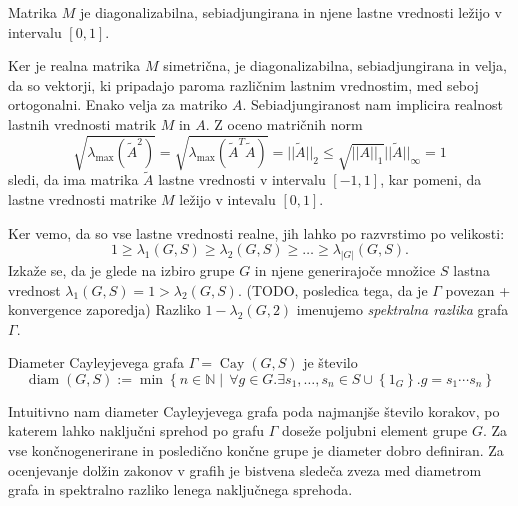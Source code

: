 \documentclass[mat1, tisk]{fmfdelo}
\numberwithin{equation}{section}  %
\begin{document}
\begin{lema}
\label{lem_M_je_sebiadjungirana}
Matrika $M$ je diagonalizabilna, sebiadjungirana in njene lastne vrednosti ležijo v intervalu $[0, 1]$.
\end{lema}
\begin{dokaz}
Ker je realna matrika $M$ simetrična, je diagonalizabilna, sebiadjungirana in velja, da so vektorji, ki pripadajo paroma različnim lastnim vrednostim, med seboj ortogonalni. Enako velja za matriko $A$. Sebiadjungiranost nam implicira realnost lastnih vrednosti matrik $M$ in $A$.
Z oceno matričnih norm \begin{equation*}
    \sqrt{ \lambda_{\max} (\tilde{A}^2)} = \sqrt{\lambda_{\max} (\tilde{A}^{T} \tilde{A} )}  = \lvert\lvert \tilde{A} \rvert\rvert_2 \le \sqrt{\lvert\lvert A \rvert\rvert_1}  \lvert\lvert \tilde{A} \rvert\rvert_{\infty} = 1 
\end{equation*}  
sledi, da ima matrika $\tilde{A}$ lastne vrednosti v intervalu $[-1 ,1]$, kar pomeni, da lastne vrednosti matrike $M$ ležijo v intevalu $[0, 1]$. 
\end{dokaz}

Ker vemo, da so vse lastne vrednosti realne, jih lahko po razvrstimo po velikosti: 
\begin{equation*}
1 \ge \lambda_1(G, S) \ge \lambda_2(G, S) \ge \ldots \ge \lambda_{\lvert G \rvert }(G, S).  
\end{equation*}  
Izkaže se, da je glede na izbiro grupe $G$ in njene generirajoče množice $S$ lastna vrednost $\lambda_1(G, S) = 1 > \lambda_2(G, S)$. (TODO, posledica tega, da je $\Gamma$ povezan + konvergence zaporedja)
Razliko $1 - \lambda_2(G, 2)$ imenujemo \emph{spektralna razlika} grafa $\Gamma$. 

\begin{definicija}
\label{def_diameter_cayleyjevega_grafa}
Diameter Cayleyjevega grafa $\Gamma = \operatorname{Cay}(G, S)$ je število \begin{equation*}
    \operatorname{diam}(G, S) := \min \left\{ n \in \mathbb{N}  \middle|\, \forall g \in G. \exists s_1, \ldots , s_n \in S \cup \left\{ 1_G \right\} . g = s_1 \cdots s_n \right\} 
\end{equation*}  
\end{definicija}
Intuitivno nam diameter Cayleyjevega grafa poda najmanjše število korakov, po katerem lahko naključni sprehod po grafu $\Gamma$ doseže poljubni element grupe $G$. Za vse končnogenerirane in posledično končne grupe je diameter dobro definiran.
Za ocenjevanje dolžin zakonov v grafih je bistvena sledeča zveza med diametrom grafa in spektralno razliko lenega naključnega sprehoda.
\end{document}
